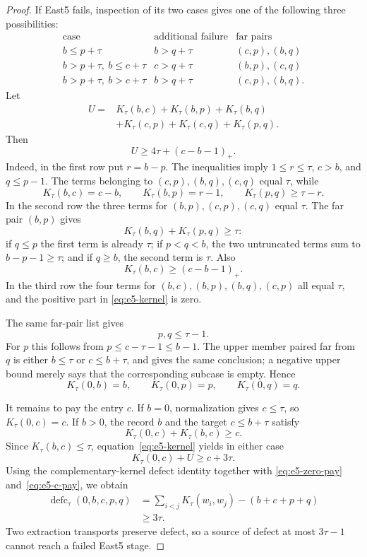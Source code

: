 \documentclass[11pt]{article}
\theoremstyle{definition}
\theoremstyle{remark}
\newcommand{\defc}{\operatorname{defc}}
\begin{document}
\begin{proof}
If East5 fails, inspection of its two cases gives one of the following three
possibilities:
\[
\begin{array}{c|c|c}
\text{case}&\text{additional failure}&\text{far pairs}\\ \hline
b\le p+\tau&b>q+\tau&(c,p),(b,q)\\
b>p+\tau,\ b\le c+\tau&c>q+\tau&(b,p),(c,q)\\
b>p+\tau,\ b>c+\tau&b>q+\tau&(c,p),(b,q).
\end{array}
\]
Let
\begin{align*}
 U={}&K_\tau(b,c)+K_\tau(b,p)+K_\tau(b,q)\\
    &+K_\tau(c,p)+K_\tau(c,q)+K_\tau(p,q).
\end{align*}
Then
\begin{equation}
 U\ge4\tau+(c-b-1)_+.
 \label{eq:e5-kernel}
\end{equation}
Indeed, in the first row put $r=b-p$.  The inequalities imply
$1\le r\le\tau$, $c>b$, and $q\le p-1$.  The terms belonging to
$(c,p),(b,q),(c,q)$ equal $\tau$, while
\[
 K_\tau(b,c)=c-b,
 \qquad K_\tau(b,p)=r-1,
 \qquad K_\tau(p,q)\ge\tau-r.
\]
In the second row the three terms for $(b,p),(c,p),(c,q)$ equal $\tau$.
The far pair $(b,p)$ gives
\[
 K_\tau(b,q)+K_\tau(p,q)\ge\tau:
\]
if $q\le p$ the first term is already $\tau$; if $p<q<b$, the two
untruncated terms sum to $b-p-1\ge\tau$; and if $q\ge b$, the second term
is $\tau$.  Also
\[
 K_\tau(b,c)\ge(c-b-1)_+.
\]
In the third row the four terms for
$(b,c),(b,p),(b,q),(c,p)$ all equal $\tau$, and the positive part in
\eqref{eq:e5-kernel} is zero.

The same far-pair list gives
\[
 p,q\le\tau-1.
\]
For $p$ this follows from
$p\le c-\tau-1\le b-1$.  The upper member paired far from $q$ is either
$b\le\tau$ or $c\le b+\tau$, and gives the same conclusion; a negative
upper bound merely says that the corresponding subcase is empty.  Hence
\begin{equation}
 K_\tau(0,b)=b,
 \qquad K_\tau(0,p)=p,
 \qquad K_\tau(0,q)=q.
 \label{eq:e5-zero-pay}
\end{equation}

It remains to pay the entry $c$.  If $b=0$, normalization gives
$c\le\tau$, so $K_\tau(0,c)=c$.  If $b>0$, the record $b$ and the target
$c\le b+\tau$ satisfy
\[
 K_\tau(0,c)+K_\tau(b,c)\ge c.
\]
Since $K_\tau(b,c)\le\tau$, equation~\eqref{eq:e5-kernel} yields in either
case
\begin{equation}
 K_\tau(0,c)+U\ge c+3\tau.
 \label{eq:e5-c-pay}
\end{equation}
Using the complementary-kernel defect identity together with
\eqref{eq:e5-zero-pay} and~\eqref{eq:e5-c-pay}, we obtain
\begin{align*}
 \defc_\tau(0,b,c,p,q)
 &=\sum_{i<j}K_\tau(w_i,w_j)-(b+c+p+q)\\
 &\ge3\tau.
\end{align*}
Two extraction transports preserve defect, so a source of defect at most
$3\tau-1$ cannot reach a failed East5 stage.
\end{proof}
\end{document}
